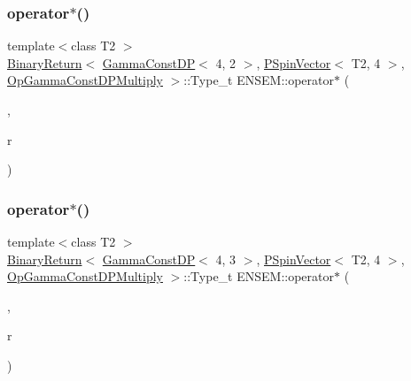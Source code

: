 \subsubsection{\texorpdfstring{operator$\ast$()}{operator*()}\hspace{0.1cm}{\footnotesize\ttfamily [19/32]}}
{\footnotesize\ttfamily template$<$class T2 $>$ \\
\mbox{\hyperlink{structENSEM_1_1BinaryReturn}{Binary\+Return}}$<$ \mbox{\hyperlink{classENSEM_1_1GammaConstDP}{Gamma\+Const\+DP}}$<$ 4, 2 $>$, \mbox{\hyperlink{classENSEM_1_1PSpinVector}{P\+Spin\+Vector}}$<$ T2, 4 $>$, \mbox{\hyperlink{structENSEM_1_1OpGammaConstDPMultiply}{Op\+Gamma\+Const\+D\+P\+Multiply}} $>$\+::Type\+\_\+t E\+N\+S\+E\+M\+::operator$\ast$ (\begin{DoxyParamCaption}\item[{const \mbox{\hyperlink{classENSEM_1_1GammaConstDP}{Gamma\+Const\+DP}}$<$ 4, 2 $>$ \&}]{,  }\item[{const \mbox{\hyperlink{classENSEM_1_1PSpinVector}{P\+Spin\+Vector}}$<$ T2, 4 $>$ \&}]{r }\end{DoxyParamCaption})\hspace{0.3cm}{\ttfamily [inline]}}

\mbox{\label{group__primspinvector_ga62ad9e5b7456ea7e7aeb04de82e03545}} 
\subsubsection{\texorpdfstring{operator$\ast$()}{operator*()}\hspace{0.1cm}{\footnotesize\ttfamily [20/32]}}
{\footnotesize\ttfamily template$<$class T2 $>$ \\
\mbox{\hyperlink{structENSEM_1_1BinaryReturn}{Binary\+Return}}$<$ \mbox{\hyperlink{classENSEM_1_1GammaConstDP}{Gamma\+Const\+DP}}$<$ 4, 3 $>$, \mbox{\hyperlink{classENSEM_1_1PSpinVector}{P\+Spin\+Vector}}$<$ T2, 4 $>$, \mbox{\hyperlink{structENSEM_1_1OpGammaConstDPMultiply}{Op\+Gamma\+Const\+D\+P\+Multiply}} $>$\+::Type\+\_\+t E\+N\+S\+E\+M\+::operator$\ast$ (\begin{DoxyParamCaption}\item[{const \mbox{\hyperlink{classENSEM_1_1GammaConstDP}{Gamma\+Const\+DP}}$<$ 4, 3 $>$ \&}]{,  }\item[{const \mbox{\hyperlink{classENSEM_1_1PSpinVector}{P\+Spin\+Vector}}$<$ T2, 4 $>$ \&}]{r }\end{DoxyParamCaption})\hspace{0.3cm}{\ttfamily [inline]}}


